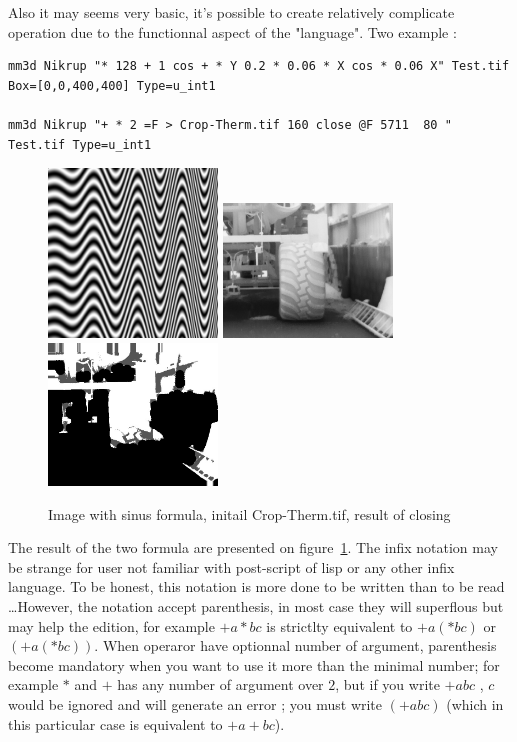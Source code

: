 Also it may seems very basic, it's possible to create relatively complicate
operation due to the functionnal aspect of the "language".  Two example :


\begin{verbatim}
mm3d Nikrup "* 128 + 1 cos + * Y 0.2 * 0.06 * X cos * 0.06 X" Test.tif Box=[0,0,400,400] Type=u_int1

mm3d Nikrup "+ * 2 =F > Crop-Therm.tif 160 close @F 5711  80 " Test.tif Type=u_int1
\end{verbatim}



\begin{figure}
\begin{center}
\includegraphics[width=45mm]{ImNikrup/Sin.jpg}
\includegraphics[width=45mm]{ImNikrup/CropTrac.jpg}
\includegraphics[width=45mm]{ImNikrup/CloseTrac.jpg}
\end{center}
\caption{Image with sinus formula, initail Crop-Therm.tif, result of closing}
\label{FIG:Nikrup1}
\end{figure}


The result of the two formula are presented on figure~\ref{FIG:Nikrup1}. The
infix notation may be strange for user not familiar with post-script of lisp or
any other infix language. To be honest, this notation is more done to be 
written than to be read  \dots However, the notation accept parenthesis,
in most case they will superflous but may help the edition, for example
$+ a * b c$ is strictlty equivalent to $+ a (* b c)$ or $(+ a (* b c))$.
When operaror have optionnal number of argument, parenthesis become
mandatory when you want to use it more than the minimal number; for
example $*$ and $+$ has any number of argument over $2$, but if you
write $+ a  b c$ , $c$ would be ignored and will generate an error ;
you must write $(+ a b c)$ (which in this particular case is equivalent to $+ a + b c$).

